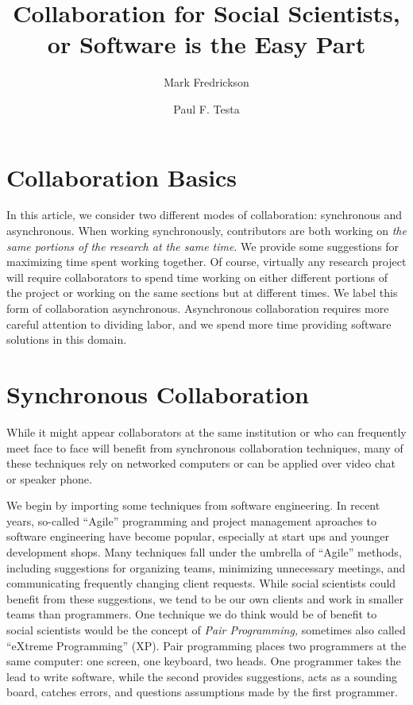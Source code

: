 \documentclass[]{article}
\author{Mark Fredrickson \and Paul F. Testa} %
\title{Collaboration for Social Scientists, or Software is the Easy Part}
\begin{document}
\maketitle
\section{Collaboration Basics}


In this article, we consider two different modes of collaboration: synchronous
and asynchronous. When working synchronously, contributors are both working on
\emph{the same portions of the research at the same time}. We provide some
suggestions for maximizing time spent working together. Of course, virtually
any research project will require collaborators to spend time working on
either different portions of the project or working on the same sections but
at different times. We label this form of collaboration asynchronous.
Asynchronous collaboration requires more careful attention to dividing labor,
and we spend more time providing software solutions in this domain.

\section{Synchronous Collaboration}

While it might appear collaborators at the same institution or who can
frequently meet face to face will benefit from synchronous collaboration
techniques, many of these techniques rely on networked computers or can be
applied over video chat or speaker phone.

We begin by importing some techniques from software engineering. In recent
years, so-called ``Agile'' programming and project management aproaches to
software engineering have become popular, especially at start ups and younger
development shops. Many techniques fall under the umbrella of ``Agile''
methods, including suggestions for organizing teams, minimizing unnecessary
meetings, and communicating frequently changing client requests. While social
scientists could benefit from these suggestions, we tend to be our own clients
and work in smaller teams than programmers. One technique we do think would be
of benefit to social scientists would be the concept of \emph{Pair
Programming,} sometimes also called ``eXtreme Programming'' (XP). Pair
programming places two programmers at the same computer: one screen, one
keyboard, two heads. One programmer takes the lead to write software, while
the second provides suggestions, acts as a sounding board, catches errors, and
questions assumptions made by the first programmer. 
\end{document}
